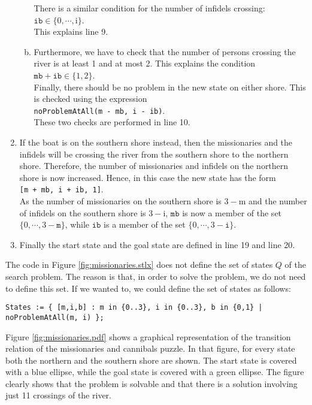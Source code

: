 \begin{enumerate}
\begin{enumerate}[(a)]
            There is a similar condition for the number of infidels crossing:
            \\[0.2cm]
            \hspace*{1.3cm}
            $\mathtt{ib} \in \{0,\cdots,\mathrm{i}\}$.
            \\[0.2cm]
            This explains line 9.
      \item Furthermore, we have to check that the number of persons crossing the river is at least 1
            and at most 2.  This explains the condition
            \\[0.2cm]
            \hspace*{1.3cm}
            $\mathtt{mb} + \mathtt{ib} \in \{1,2\}$.
            \\[0.2cm]
            Finally, there should be no problem in the new state on either shore.  This is checked
            using the expression
            \\[0.2cm]
            \hspace*{1.3cm}
            \texttt{noProblemAtAll(m - mb, i - ib)}.
            \\[0.2cm]
            These two checks are performed in line 10.
      \end{enumerate}
\item If the boat is on the southern shore instead, then the missionaries and the infidels will be crossing
      the river from the southern shore to the northern shore.  Therefore, the number of missionaries and
      infidels on the northern shore is now increased.  Hence, in this case the new state has the form
      \\[0.2cm]
      \hspace*{1.3cm}
      \texttt{[m + mb, i + ib, 1]}.
      \\[0.2cm]
      As the number of missionaries on the southern shore is $3 - \mathrm{m}$ and the number of infidels on the
      southern shore is $3 - \mathrm{i}$, $\mathtt{mb}$ is now a member of the set $\{0,\cdots,3 -\mathtt{m}\}$, while
      $\mathtt{ib}$ is a member of the set $\{0,\cdots,3 - \mathtt{i}\}$.
\item Finally the start state and the goal state are defined in line 19 and line 20.
\end{enumerate}
The code in Figure \ref{fig:missionaries.stlx} does not define the set of states $Q$ of the search problem.  The
reason is that, in order to solve the problem, we do not need to define this set.  If we wanted to, we could
define the set of states as follows: 
\begin{verbatim}
States := { [m,i,b] : m in {0..3}, i in {0..3}, b in {0,1} | noProblemAtAll(m, i) };
\end{verbatim}
Figure \ref{fig:missionaries.pdf} shows a graphical representation of the transition relation of the
missionaries and cannibals puzzle.  In that figure, for every state both the northern and the
southern shore are shown.  The start state is covered with a blue ellipse, while the goal state is
covered with a green ellipse.  The figure clearly shows that the problem is solvable and that there
is a solution involving just 11 crossings of the river.
\eox

